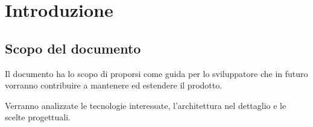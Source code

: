 \section{Introduzione}






\subsection{Scopo del documento}

Il documento ha lo scopo di proporsi come guida per lo sviluppatore che in futuro
vorranno contribuire a mantenere ed estendere il prodotto.

Verranno analizzate le tecnologie interessate, l'architettura nel dettaglio e le scelte
progettuali.


